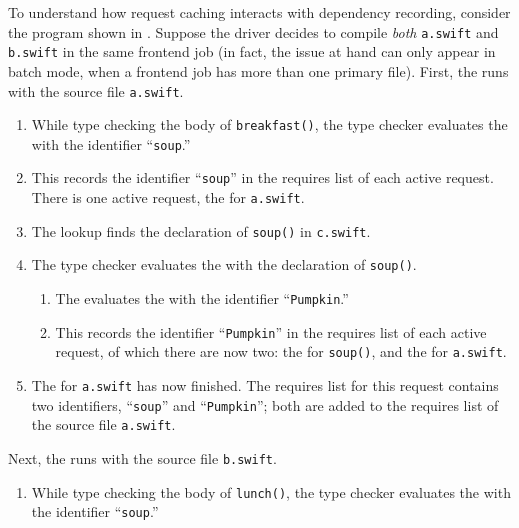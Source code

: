 \documentclass[../generics]{subfiles}
\begin{document}
\begin{example}
To understand how request caching interacts with dependency recording, consider the program shown in . Suppose the driver decides to compile \emph{both} \texttt{a.swift} and \texttt{b.swift} in the same frontend job (in fact, the issue at hand can only appear in batch mode, when a frontend job has more than one primary file). First, the  runs with the source file \texttt{a.swift}.
\begin{enumerate}
\item While type checking the body of \texttt{breakfast()}, the type checker evaluates the  with the identifier ``\texttt{soup}.''
\item This records the identifier ``\texttt{soup}'' in the requires list of each active request. There is one active request, the  for \texttt{a.swift}.
\item The lookup finds the declaration of \texttt{soup()} in \texttt{c.swift}.
\item The type checker evaluates the  with the declaration of \texttt{soup()}.
\begin{enumerate}
\item The  evaluates the  with the identifier ``\texttt{Pumpkin}.''
\item This records the identifier ``\texttt{Pumpkin}'' in the requires list of each active request, of which there are now two: the  for \texttt{soup()}, and the  for \texttt{a.swift}.
\end{enumerate}
\item The  for \texttt{a.swift} has now finished. The requires list for this request contains two identifiers, ``\texttt{soup}'' and ``\texttt{Pumpkin}''; both are added to the requires list of the source file \texttt{a.swift}.
\end{enumerate}
Next, the  runs with the source file \texttt{b.swift}.
\begin{enumerate}
\item While type checking the body of \texttt{lunch()}, the type checker evaluates the  with the identifier ``\texttt{soup}.''

\end{enumerate}
\end{example}
\end{document}

